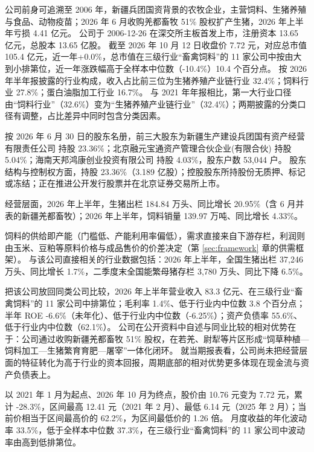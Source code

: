  公司前身可追溯至 2006 年，新疆兵团国资背景的农牧企业，主营饲料、生猪养殖与食品、动物疫苗；2026 年 6 月收购羌都畜牧 51\% 股权扩产生猪，2026 年上半年亏损 4.41 亿元。 公司于 2006-12-26 在深交所主板首发上市，注册资本 13.65 亿元，总股本 13.65 亿股。 截至 2026 年 10 月 12 日收盘价 7.72 元，对应总市值 105.4 亿元，近一年+0.0\%，总市值在三级行业“畜禽饲料”的 11 家公司中按由大到小排第位，近一年涨跌幅高于全样本中位数（-10.4\%）10.4 个百分点。 按 2026 年半年报披露的行业构成，收入占比前三位为生猪养殖产业链行业 32.4\%；饲料行业 27.8\%；蛋白油脂加工行业 16.7\%。 与 2021 年年报相比，第一大行业口径由“饲料行业”（32.6\%）变为“生猪养殖产业链行业”（32.4\%）；两期披露的分类口径有调整，占比差异中同时包含分类因素。

 按 2026 年 6 月 30 日的股东名册，前三大股东为新疆生产建设兵团国有资产经营有限责任公司 持股 23.36\%；北京融元宝通资产管理合伙企业(有限合伙) 持股 5.04\%；海南天邦鸿康创业投资有限公司 持股 4.03\%，股东户数 53,044 户。 股东结构与控制权方面，持股 23.36\%（3.189 亿股）；控股股东所持股份无质押、标记或冻结；正在推进公开发行股票并在北京证券交易所上市。

 经营层面，2026 年上半年，生猪出栏 184.84 万头、同比增长 20.95\%（含 6 月并表的新疆羌都畜牧）；2026 年上半年，饲料销量 139.97 万吨、同比增长 4.33\%。

 饲料的供给即产能（门槛低、产能利用率偏低），需求直接来自下游存栏，利润则由玉米、豆粕等原料价格与成品售价的价差决定（第 \ref{sec:framework} 章的供需框架）。 与该公司直接相关的行业数据包括：2026 年上半年，全国生猪出栏 37,246 万头、同比增长 1.7\%，二季度末全国能繁母猪存栏 3,780 万头、同比下降 6.5\%。

 把该公司放回同类公司比较，2026 年上半年营业收入 83.3 亿元、在三级行业“畜禽饲料”的 11 家公司中排第位；毛利率 1.4\%、低于行业内中位数 3.8 个百分点；半年 ROE -6.6\%（未年化）、低于行业内中位数（-6.25\%）；资产负债率 55.6\%、低于行业内中位数（62.1\%）。 公司在公开资料中自述与同业比较的相对优势在于：公司通过收购新疆羌都畜牧 51\% 股权，在若羌、尉犁等片区形成“饲草种植—饲料加工—生猪繁育育肥—屠宰”一体化闭环。 就当期报表看，公司尚未把经营层面的特征转化为高于行业的资本回报，周期底部的相对优势更多体现在现金流与资产负债表上。

 以 2021 年 1 月为起点、2026 年 10 月为终点，股价由 10.76 元变为 7.72 元，累计 -28.3\%，区间最高 12.41 元（2021 年 2 月）、最低 6.14 元（2025 年 2 月）；当前价相当于区间最高价的 62.2\%，为区间最低价的 1.26 倍。 月度收益的年化波动率 33.5\%，低于全样本中位数 37.3\%，在三级行业“畜禽饲料”的 11 家公司中波动率由高到低排第位。

